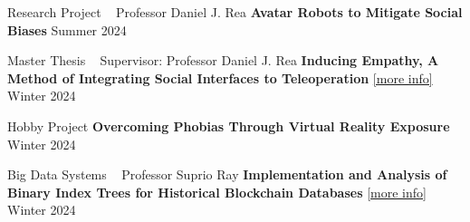 
\begin{cventries}

    \cventry
    {Research Project ~ Professor Daniel J. Rea}
    {\textbf {Avatar Robots to Mitigate Social Biases}}
    {}
    {Summer 2024}
    {}
    \vspace{0.0 cm}

  \end{cventries}
  \begin{cventries}
  
    \cventry
    {Master Thesis ~ Supervisor: Professor Daniel J. Rea}
    {\textbf {Inducing Empathy, A Method of Integrating Social Interfaces to Teleoperation}
    \href{https://github.com/ph504/Teleoperation-Interface}{\textcolor{cobalt}{[more info]}}}
    {}
    {Winter 2024}
    {}
    \vspace{0.0 cm}
  \end{cventries}
  \begin{cventries}
    \cventry
    {Hobby Project}
    {\textbf {Overcoming Phobias Through Virtual Reality Exposure}}
    {}
    {Winter 2024}
    {}
    \vspace{0.0 cm}

  \end{cventries}
  \begin{cventries}
    \cventry
    {Big Data Systems ~ Professor Suprio Ray}
    {\textbf {Implementation and Analysis of Binary Index Trees for Historical Blockchain Databases}
    \href{https://github.com/ph504/avl-blockchain}{\textcolor{cobalt}{[more info]}}}
    {}
    {Winter 2024}
    {}
    \vspace{0.0 cm}
  
  \end{cventries}
